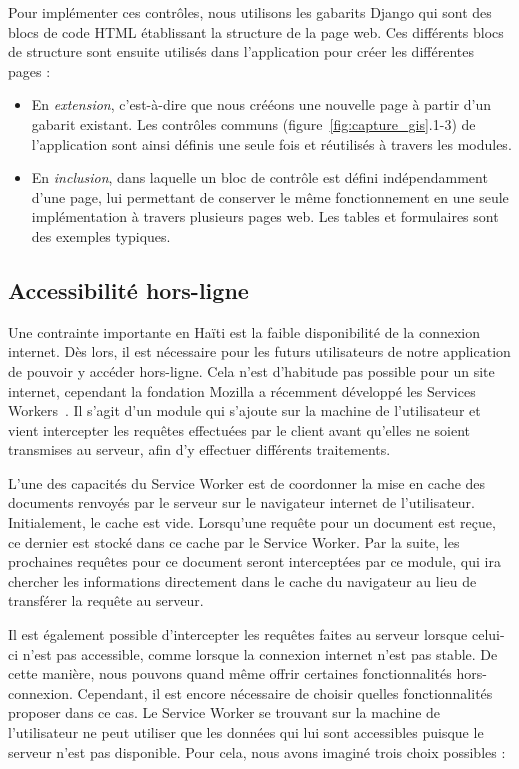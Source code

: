 \documentclass{EPL-master-thesis-covers-FR}
\begin{document}
				Pour implémenter ces contrôles, nous utilisons les gabarits Django qui sont des blocs de code HTML établissant la structure de la page web. Ces différents blocs de structure sont ensuite utilisés dans l'application pour créer les différentes pages :
				\begin{itemize}
					\item En \emph{extension}, c'est-à-dire que nous crééons une nouvelle page à partir d'un gabarit existant. Les contrôles communs (figure~\ref{fig:capture_gis}.1-3) de l'application sont ainsi définis une seule fois et réutilisés à travers les modules.
					\item En \emph{inclusion}, dans laquelle un bloc de contrôle est défini indépendamment d'une page, lui permettant de conserver le même fonctionnement en une seule implémentation à travers plusieurs pages web. Les tables et formulaires sont des exemples typiques.
				\end{itemize}

			\subsection*{Accessibilité hors-ligne}
				\label{sec:service_worker}

				Une contrainte importante en Haïti est la faible disponibilité de la connexion internet. Dès lors, il est nécessaire pour les futurs utilisateurs de notre application de pouvoir y accéder hors-ligne. Cela n'est d'habitude pas possible pour un site internet, cependant la fondation Mozilla a récemment développé les Services Workers~\cite{ref:serviceworker}. Il s'agit d'un module qui s'ajoute sur la machine de l'utilisateur et vient intercepter les requêtes effectuées par le client avant qu'elles ne soient transmises au serveur, afin d'y effectuer différents traitements.

				L'une des capacités du Service Worker est de coordonner la mise en cache des documents renvoyés par le serveur sur le navigateur internet de l'utilisateur. Initialement, le cache est vide. Lorsqu'une requête pour un document est reçue, ce dernier est stocké dans ce cache par le Service Worker. Par la suite, les prochaines requêtes pour ce document seront interceptées par ce module, qui ira chercher les informations directement dans le cache du navigateur au lieu de transférer la requête au serveur.

				Il est également possible d'intercepter les requêtes faites au serveur lorsque celui-ci n'est pas accessible, comme lorsque la connexion internet n'est pas stable. De cette manière, nous pouvons quand même offrir certaines fonctionnalités hors-connexion. Cependant, il est encore nécessaire de choisir quelles fonctionnalités proposer dans ce cas. Le Service Worker se trouvant sur la machine de l'utilisateur ne peut utiliser que les données qui lui sont accessibles puisque le serveur n'est pas disponible. Pour cela, nous avons imaginé trois choix possibles :
\end{document}
